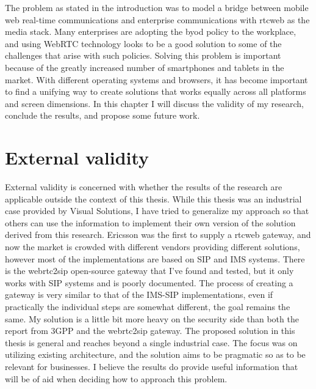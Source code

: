 

The problem as stated in the introduction was to model a bridge between mobile web real-time communications and enterprise communications with \gls{rtcweb} as the media stack. Many enterprises are adopting the \gls{byod} policy to the workplace, and using WebRTC technology looks to be a good solution to some of the challenges that arise with such policies. Solving this problem is important because of the greatly increased number of smartphones and tablets in the market. With different operating systems and browsers, it has become important to find a unifying way to create solutions that works equally across all platforms and screen dimensions. In this chapter I will discuss the validity of my research, conclude the results, and propose some future work.


\section{External validity}
External validity is concerned with whether the results of the research are applicable outside the context of this thesis. While this thesis was an industrial case provided by Visual Solutions, I have tried to generalize my approach so that others can use the information to implement their own version of the solution derived from this research. Ericsson was the first to supply a \gls{rtcweb} gateway, and now the market is crowded with different vendors providing different solutions, however most of the implementations are based on SIP and IMS systems. There is the webrtc2sip open-source gateway that I've found and tested, but it only works with SIP systems and is poorly documented. The process of creating a gateway is very similar to that of the IMS-SIP implementations, even if practically the individual steps are somewhat different, the goal remains the same. My solution is a little bit more heavy on the security side than both the report from 3GPP\cite{3gpp-wrtc-access-ims} and the webrtc2sip gateway. The proposed solution in this thesis is general and reaches beyond a single industrial case. The focus was on utilizing existing architecture, and the solution aims to be pragmatic so as to be relevant for businesses. I believe the results do provide useful information that will be of aid when deciding how to approach this problem.

